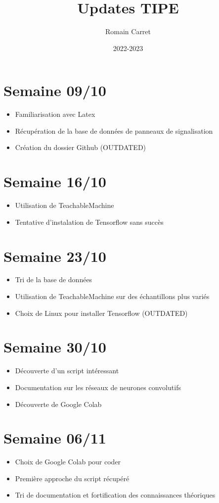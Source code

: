 \documentclass{report}
\title{Updates TIPE}
\author{Romain Carret}
\date{2022-2023}
\begin{document}
		\maketitle{}
		\section*{Semaine 09/10}
			\begin{itemize}
				\item Familiarisation avec Latex
				\item Récupération de la base de données de panneaux de signalisation
				\item Création du dossier Github (OUTDATED)
			\end{itemize}
		\section*{Semaine 16/10}
			\begin{itemize}
				\item Utilisation de TeachableMachine
				\item Tentative d'instalation de Tensorflow sans succès
			\end{itemize}
		\section*{Semaine 23/10}
			\begin{itemize}
				\item Tri de la base de données
				\item Utilisation de TeachableMachine sur des échantillons plus variés
				\item Choix de Linux pour installer Tensorflow (OUTDATED)
			\end{itemize}
		\section*{Semaine 30/10}
			\begin{itemize}
				\item Découverte d'un script intéressant
				\item Documentation sur les réseaux de neurones convolutifs
				\item Découverte de Google Colab
			\end{itemize}
		\section*{Semaine 06/11}
			\begin{itemize}
				\item Choix de Google Colab pour coder
				\item Première approche du script récupéré
				\item Tri de documentation et fortification des connaissances théoriques
			\end{itemize}
\end{document}
